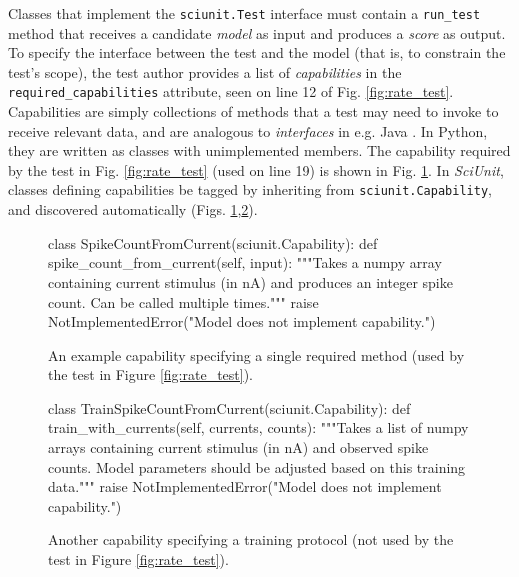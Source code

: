 \documentclass[11pt,letterpaper]{article}
\let\verbx\lstinline
\begin{document}
Classes that implement the \verbx{sciunit.Test} interface must contain a \verbx{run_test} method that receives a candidate \emph{model} as input and produces a \textit{score} as output. 
To specify the interface between the test and the model (that is, to constrain the test's scope), the test author provides a list of \emph{capabilities} in the \verbx{required_capabilities} attribute, seen on line 12 of Fig. \ref{fig:rate_test}. 
Capabilities are simply collections of methods that a test may need to invoke to receive relevant data, and are analogous to \emph{interfaces} in e.g. Java \cite{java_interfaces_url}. 
In Python, they are written as classes with unimplemented members. 
The capability required by the test in Fig. \ref{fig:rate_test} (used on line 19) is shown in Fig. \ref{fig:capability}. 
In \textit{SciUnit}, classes defining capabilities be tagged by inheriting from \verbx{sciunit.Capability}, and discovered automatically (Figs. \ref{fig:capability},\ref{fig:training}). 

\begin{figure}
\begin{python}
class SpikeCountFromCurrent(sciunit.Capability):
  def spike_count_from_current(self, input): 
    """Takes a numpy array containing current stimulus (in nA) and
    produces an integer spike count. Can be called multiple times."""
    raise NotImplementedError("Model does not implement capability.")
\end{python}
\caption{An example capability specifying a single required method (used by the test in Figure \ref{fig:rate_test}).}
\label{fig:capability}
\vspace{-10px}
\end{figure}

\begin{figure}
\begin{python}
class TrainSpikeCountFromCurrent(sciunit.Capability):
  def train_with_currents(self, currents, counts):
    """Takes a list of numpy arrays containing current stimulus (in nA) and
    observed spike counts. Model parameters should be adjusted based on this
    training data."""
    raise NotImplementedError("Model does not implement capability.")
\end{python}
\caption{Another capability specifying a training protocol (not used by the test in Figure \ref{fig:rate_test}).}
\label{fig:training}
\vspace{-15px}
\end{figure}
\end{document}
